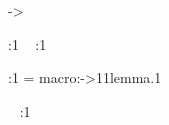 \begingroup
  \HyRef@currentHtag -> \lemmaautorefname~%
  \Hy@safe@activesfalse %
  \hyper@@link{%
    \expandafter\@fifthoffive\r@lem:1\@empty\@empty\@empty
  }{%
    \expandafter\@fourthoffive\r@lem:1\@empty\@empty\@empty
  }{%
    \HyRef@currentHtag
    \expandafter\@firstoffive\r@lem:1\@empty\@empty\@empty
    \null
  }%
\endgroup


\def\hyper@@link{\let\Hy@reserved@a\relax
  \@ifnextchar[{\hyper@link@}{\hyper@link@[link]}%
}

\begingroup
  \edef\HyRef@currentHtag{\lemmaautorefname~}%
  \hyper@link@[link]
    {\expandafter\@fifthoffive\r@lem:1\@empty\@empty\@empty}
    {\expandafter\@fourthoffive\r@lem:1\@empty\@empty\@empty}
    {%
      \HyRef@currentHtag
      \expandafter\@firstoffive\r@lem:1\@empty\@empty\@empty
      \null
    }%
\endgroup


\def\hyper@link@[#1]#2#3#4{%
  \ltx@ifempty{#4}{%
    \Hy@Warning{Suppressing empty link}%
  }{%
    \begingroup
      \protected@edef\Hy@tempa{#2}%
      \edef\Hy@tempb{#3}%
      \ifx\Hy@tempa\ltx@empty
        \ifx\Hy@tempb\ltx@empty
          \Hy@Warning{Suppressing link with empty target}%
          \toks@{%
            \endgroup
            \ltx@secondoftwo
          }%
        \else
          \toks@{%
            \endgroup
            \hyper@link{#1}%
          }%
        \fi
      \else
        \toks@{%
          \endgroup
          \expandafter\hyper@readexternallink#2\\{#1}%
        }%
      \fi
      \Hy@safe@activesfalse
      \toks@\expandafter{%
        \the\expandafter\toks@
        \expandafter{\Hy@tempb}{#4}%
      }%
    \the\toks@
  }%
}

\r@lem:1 = macro:->{1}{1}{}{lemma.1}{}

\begingroup
  \edef\HyRef@currentHtag{\lemmaautorefname~}%
      \begingroup
        \protected@edef\Hy@tempa{}%
        \edef\Hy@tempb{lemma.1}%
      \endgroup {}
\endgroup

\begingroup
  \edef\HyRef@currentHtag{\lemmaautorefname~}%
    {%
      \HyRef@currentHtag
      \expandafter\@firstoffive\r@lem:1\@empty\@empty\@empty
      \null
    }%
\endgroup

\def\hyper@link#1#2#3{%
  \Hy@VerboseLinkStart{#1}{#2}%
  \ltx@IfUndefined{@#1bordercolor}{%
    \let\CurrentBorderColor\relax
  }{%
    \edef\CurrentBorderColor{\csname @#1bordercolor\endcsname}%
  }%
  \find@pdflink{#1}{#2}#3\Hy@xspace@end
  \close@pdflink
}
